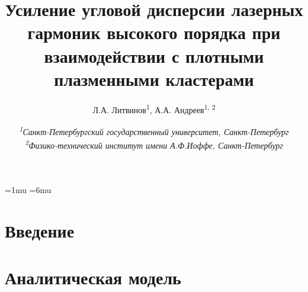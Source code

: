 \documentclass[10pt]{article}
\begin{document}



	\pagestyle{fancy}
	\fancyhf{}
	\fancyhead[L]{\textit{\nouppercase{\leftmark}}}
	\fancyfoot[C]{\thepage}

	\thinmuskip=1mu
	\thickmuskip=6mu
	\def\stacktype{S}\Sstackgap=-4.3pt
	\captionsetup[subfigure]{margin=0.05\textwidth}


	\newcommand{\subfigureautorefname}{\figureautorefname}
	\renewcommand{\thesubfigure}{\asbuk{subfigure}}


	\title{Усиление угловой дисперсии лазерных гармоник высокого порядка при взаимодействии с плотными плазменными кластерами}
	\author{
		Л.А. Литвинов\textsuperscript{1}, А.А. Андреев\textsuperscript{1, 2}
	}
	\date{
		\normalsize{\textit{\textsuperscript{1}Санкт-Петербургский государственный университет, Санкт-Петербург \\ \textsuperscript{2}Физико-технический институт имени А.Ф.Иоффе, Санкт-Петербург}}
	}
	\maketitle

	

	\section{Введение}
	\section{Аналитическая модель}

	

	\clearpage
	
	
\end{document}
